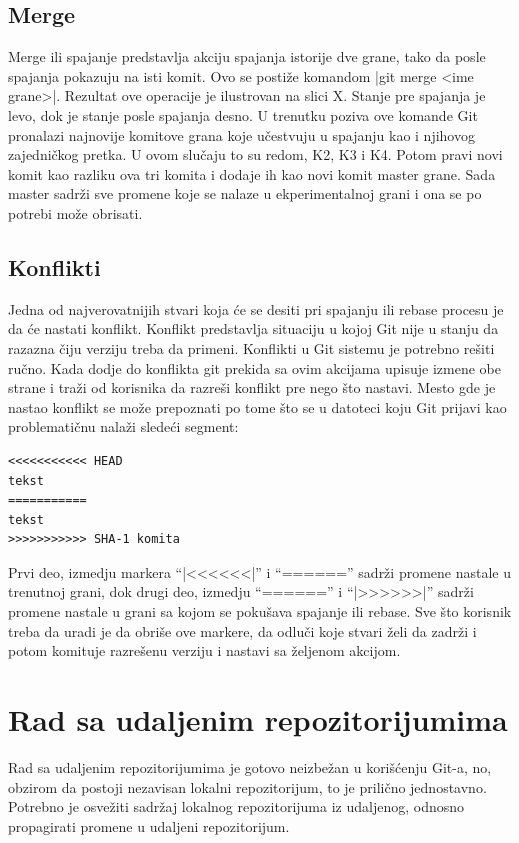 \documentclass[a4paper]{article}
\begin{document}
{\subsection{Merge}
\label{subsec:merge}
Merge ili spajanje predstavlja akciju spajanja istorije dve grane, tako da posle spajanja pokazuju na isti komit. Ovo se postiže komandom |git merge <ime grane>|. Rezultat ove operacije je ilustrovan na slici X. Stanje pre spajanja je levo, dok je stanje posle spajanja desno. U trenutku poziva ove komande Git pronalazi najnovije komitove grana koje učestvuju u spajanju kao i njihovog zajedničkog pretka. U ovom slučaju to su redom, K2, K3 i K4. Potom pravi novi komit kao razliku ova tri komita i dodaje ih kao novi komit master grane. Sada master sadrži sve promene koje se nalaze u ekperimentalnoj grani i ona se po potrebi može obrisati.

\subsection{Konflikti}
Jedna od najverovatnijih stvari koja će se desiti pri spajanju ili rebase procesu je da će nastati konflikt. Konflikt predstavlja situaciju u kojoj Git nije u stanju da razazna čiju verziju treba da primeni. Konflikti u Git sistemu je potrebno rešiti ručno. Kada dodje do konflikta git prekida sa ovim akcijama upisuje izmene obe strane i traži od korisnika da razreši konflikt pre nego što nastavi. Mesto gde je nastao konflikt se može prepoznati po tome što se u datoteci koju Git prijavi kao problematičnu nalaži sledeći segment:
\begin{lstlisting}
<<<<<<<<<<< HEAD
tekst
===========
tekst
>>>>>>>>>>> SHA-1 komita
\end{lstlisting}
Prvi deo, izmedju markera ``|<<<<<<|'' i ``======'' sadrži promene nastale u trenutnoj grani, dok drugi deo, izmedju  ``======'' i ``|>>>>>>|'' sadrži promene nastale u grani sa kojom se pokušava spajanje ili rebase. Sve što korisnik treba da uradi je da obriše ove markere, da odluči koje stvari želi da zadrži i potom komituje razrešenu verziju i nastavi sa željenom akcijom.
\section{Rad sa udaljenim repozitorijumima}
\label{sec:udaljeni_repozitorijumi}
Rad sa udaljenim repozitorijumima je gotovo neizbežan u korišćenju Git-a, no, obzirom da postoji nezavisan lokalni repozitorijum, to je prilično jednostavno. Potrebno je osvežiti sadržaj lokalnog repozitorijuma iz udaljenog, odnosno propagirati promene u udaljeni repozitorijum.


}
\end{document}
